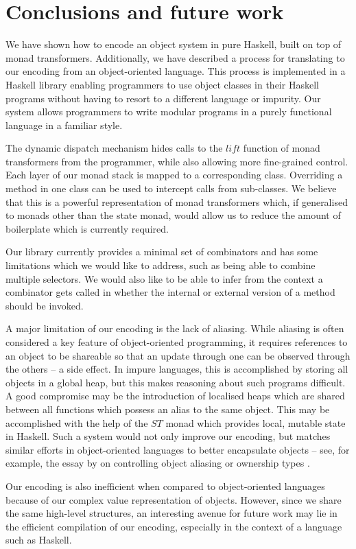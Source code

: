 \section{Conclusions and future work}
\label{sec:conclusions}

We have shown how to encode an object system in pure Haskell, built on top of monad transformers. Additionally, we have described a process for translating to our encoding from an object-oriented language. This process is implemented in a Haskell library enabling programmers to use object classes in their Haskell programs without having to resort to a different language or impurity. Our system allows programmers to write modular programs in a purely functional language in a familiar style. 

The dynamic dispatch mechanism hides calls to the $\mathit{lift}$ function of monad transformers from the programmer, while also allowing more fine-grained control. Each layer of our monad stack is mapped to a corresponding class. Overriding a method in one class can be used to intercept calls from sub-classes. We believe that this is a powerful representation of monad transformers which, if generalised to monads other than the state monad, would allow us to reduce the amount of boilerplate which is currently required.

Our library currently provides a minimal set of combinators and has some limitations which we would like to address, such as being able to combine multiple selectors. We would also like to be able to infer from the context a combinator gets called in whether the internal or external version of a method should be invoked.

A major limitation of our encoding is the lack of aliasing. While aliasing is often considered a key feature of object-oriented programming, it requires references to an object to be shareable so that an update through one can be observed through the others -- a side effect. In impure languages, this is accomplished by storing all objects in a global heap, but this makes reasoning about such programs difficult. A good compromise may be the introduction of localised heaps which are shared between all functions which possess an alias to the same object. This may be accomplished with the help of the $\mathit{ST}$ monad \cite{launchbury1995state} which provides local, mutable state in Haskell. Such a system would not only improve our encoding, but matches similar efforts in object-oriented languages to better encapsulate objects -- see, for example, the essay by \citet{hogg1992geneva} on controlling object aliasing or ownership types \cite{clarke1998ownership}.

Our encoding is also inefficient when compared to object-oriented languages because of our complex value representation of objects. However, since we share the same high-level structures, an interesting avenue for future work may lie in the efficient compilation of our encoding, especially in the context of a language such as Haskell. 


